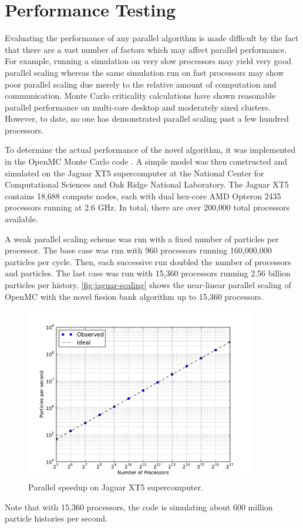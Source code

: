 \section{Performance Testing}

Evaluating the performance of any parallel algorithm is made difficult by the
fact that there are a vast number of factors which may affect parallel
performance. For example, running a simulation on very slow processors may yield
very good parallel scaling whereas the same simulation run on fast processors
may show poor parallel scaling due merely to the relative amount of computation
and communication. Monte Carlo criticality calculations have shown reasonable
parallel performance on multi-core desktop and moderately sized
clusters. However, to date, no one has demonstrated parallel scaling past a few
hundred processors.

To determine the actual performance of the novel algorithm, it was implemented
in the OpenMC Monte Carlo code \cite{ane-romano-2013}. A simple model was then
constructed and simulated on the Jaguar XT5 supercomputer at the National Center
for Computational Sciences and Oak Ridge National Laboratory. The Jaguar XT5
contains 18,688 compute nodes, each with dual hex-core AMD Opteron 2435
processors running at 2.6 GHz. In total, there are over 200,000 total processors
available.

A weak parallel scaling scheme was run with a fixed number of particles per
processor. The base case was run with 960 processors running 160,000,000
particles per cycle. Then, each successive run doubled the number of processors
and particles. The last case was run with 15,360 processors running 2.56 billion
particles per history. \autoref{fig:jaguar-scaling} shows the near-linear
parallel scaling of OpenMC with the novel fission bank algorithm up to 15,360
processors.
\begin{figure}[ht!]
  \centering
  \includegraphics[width=0.9\textwidth]{figures/ch3/jaguar_results/jaguar.pdf}
  \caption{Parallel speedup on Jaguar XT5 supercomputer.}
  \label{fig:jaguar-scaling}
\end{figure}
Note that with 15,360 processors, the code is simulating about 600 million
particle histories per second.

